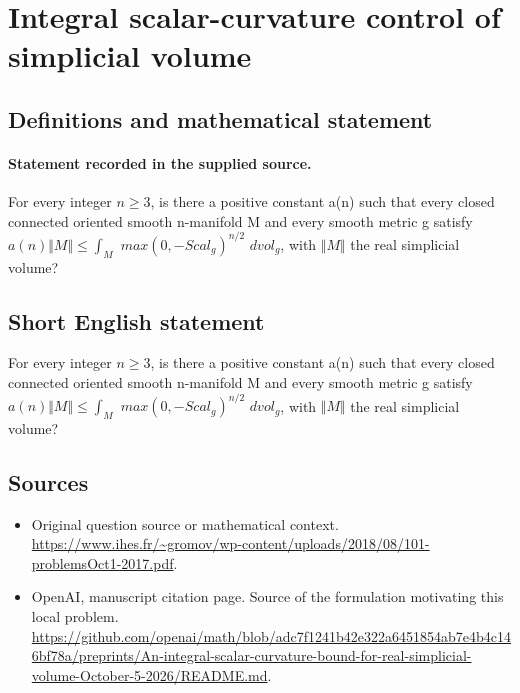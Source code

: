 \documentclass[11pt]{article}
\begin{document}
\section*{Integral scalar-curvature control of simplicial volume}\label{30007157}
\subsection{Definitions and mathematical statement}
\paragraph{Statement recorded in the supplied source.}
For every integer $n\geq 3$, is there a positive constant a(n) such that every closed connected oriented smooth n-manifold M and every smooth metric g satisfy $a(n)\Vert M\Vert \leq \int _M$ $max(0,-Scal_g)^{n/2}$ $dvol_g$, with $\Vert M\Vert $ the real simplicial volume?
\subsection{Short English statement}
For every integer $n\geq 3$, is there a positive constant a(n) such that every closed connected oriented smooth n-manifold M and every smooth metric g satisfy $a(n)\Vert M\Vert \leq \int _M$ $max(0,-Scal_g)^{n/2}$ $dvol_g$, with $\Vert M\Vert $ the real simplicial volume?
\subsection{Sources}
\begin{itemize}
\item[S1] Original question source or mathematical context.
\url{https://www.ihes.fr/~gromov/wp-content/uploads/2018/08/101-problemsOct1-2017.pdf}.
\item[S2] OpenAI, manuscript citation page. Source of the formulation motivating this local problem.
\url{https://github.com/openai/math/blob/adc7f1241b42e322a6451854ab7e4b4c146bf78a/preprints/An-integral-scalar-curvature-bound-for-real-simplicial-volume-October-5-2026/README.md}.
\end{itemize}
\end{document}
